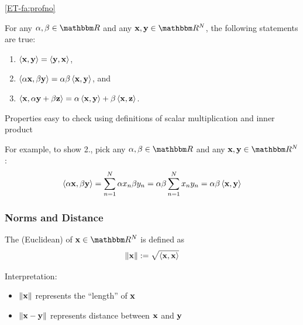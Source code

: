 \begin{frame}

    \vspace{2em}
    \Fact \eqref{ET-fa:profno}
    
    For any $\alpha, \beta \in \RR$ and any $\boldx, \boldy \in \RR^N$, the following 
    statements are true:
    \begin{enumerate}
        \item $\left\langle{ {\mathbf x} ,  {\mathbf y} }\right\rangle = \left\langle{ {\mathbf y} ,  {\mathbf x} }\right\rangle$,
        \item $\left\langle{\alpha  {\mathbf x} , \beta  {\mathbf y} }\right\rangle =  \alpha \beta
            \left\langle{ {\mathbf x} ,  {\mathbf y} }\right\rangle$, and
        \item $\left\langle{ {\mathbf x} , \alpha  {\mathbf y} + \beta  {\mathbf z} }\right\rangle =  \alpha
            \left\langle{ {\mathbf x} ,  {\mathbf y} }\right\rangle + \beta \left\langle{ {\mathbf x} ,  {\mathbf z} }\right\rangle$.
    \end{enumerate}
    
    \vspace{1em}
    Properties easy to check using definitions of scalar multiplication and inner product

    For example, to show 2.,
    pick any $\alpha, \beta \in \RR$ and any $\boldx, \boldy \in
    \RR^N$:
    \begin{equation*}
        \left\langle{\alpha  {\mathbf x} , \beta  {\mathbf y} }\right\rangle
        = \sum_{n=1}^N \alpha x_n \beta y_n
        = \alpha \beta \sum_{n=1}^N x_n y_n 
        = \alpha \beta \left\langle{ {\mathbf x} ,  {\mathbf y} }\right\rangle
    \end{equation*}

\end{frame}

\begin{frame}
    \frametitle{Norms and Distance}
    
     \vspace{2em}
    The (Euclidean)  of $\boldx \in \RR^N$ is defined as
    \begin{equation*}
        \label{eq:eucnorm}
        \| {\mathbf x} \| := \sqrt{\left\langle{ {\mathbf x} ,  {\mathbf x} }\right\rangle} 
    \end{equation*}
    
    \vspace{.7em}
    Interpretation:
    \begin{itemize}
        \item $\| {\mathbf x} \|$ represents the ``length'' of ${\mathbf x}$
            \vspace{0.5em}
        \item $\| {\mathbf x} - {\mathbf y} \|$ represents distance between ${\mathbf x}$ and ${\mathbf y}$
    \end{itemize}

\end{frame}

